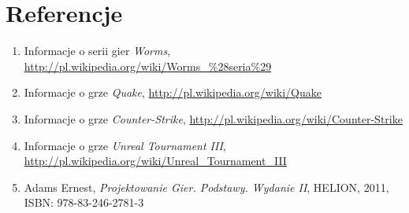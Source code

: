 \chapter{Referencje}
\begin{enumerate}
\item Informacje o serii gier \textit{Worms}, \url{http://pl.wikipedia.org/wiki/Worms_%28seria%29}
\item Informacje o grze \textit{Quake}, \url{http://pl.wikipedia.org/wiki/Quake}
\item Informacje o grze \textit{Counter-Strike}, \url{http://pl.wikipedia.org/wiki/Counter-Strike}
\item Informacje o grze \textit{Unreal Tournament III}, \url{http://pl.wikipedia.org/wiki/Unreal_Tournament_III}
\item Adams Ernest, \textit{Projektowanie Gier. Podstawy. Wydanie II}, HELION, 2011, ISBN: 978-83-246-2781-3
\end{enumerate}

